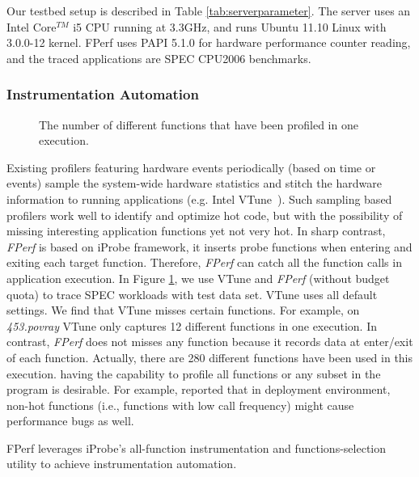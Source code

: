 Our testbed setup is described in Table \ref{tab:serverparameter}.
The server uses an Intel Core$^{TM}$ i5 CPU running at 3.3GHz, and runs Ubuntu 11.10 Linux with 3.0.0-12 kernel.
FPerf uses PAPI 5.1.0 for hardware performance counter reading, and the traced applications are SPEC CPU2006 benchmarks.

\subsubsection{Instrumentation Automation}

\begin{figure}[!ht]
    \begin{center}       
    \end{center}
    \caption{The number of different functions that have been profiled in one execution.}
    \label{fig:motiv}
\end{figure}


Existing profilers featuring hardware events periodically 
(based on time or events) sample the system-wide 
hardware statistics and stitch the hardware
information to running applications (e.g. Intel VTune~\cite{vtune}).
Such sampling based profilers work well to identify and optimize hot code,
but with the possibility of missing 
interesting application functions yet not very hot.
In sharp contrast, \textit{FPerf} is based on iProbe framework, 
it inserts probe functions when entering and exiting each target function.
Therefore, \textit{FPerf} can catch all the function calls in application
execution. In Figure \ref{fig:motiv}, we use VTune and \textit{FPerf} (without budget quota) 
to trace SPEC workloads with test data set. VTune uses all default settings. We find 
that VTune misses certain functions. For example, on {\em 453.povray} VTune only captures 
12 different functions in one execution. In contrast, \textit{FPerf}
does not misses any function because it records data
at enter/exit of each function. Actually, there
are 280 different functions have been used in this execution. 
having the capability to profile all functions or any subset in the program is desirable.
For example, \cite{Jovic:2011} reported that in deployment environment, non-hot functions (i.e.,
functions with low call frequency) might cause performance bugs as well. 

FPerf leverages iProbe's all-function instrumentation and functions-selection utility to achieve instrumentation automation.

